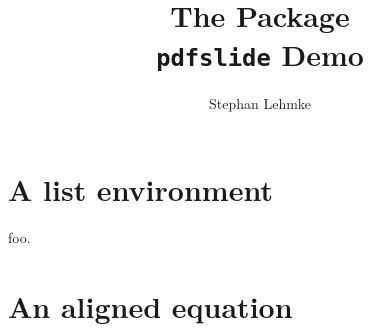 \documentclass{article}
\begin{document}
\title{The  Package\\{\normalfont \texttt{pdfslide} Demo}}
\author{Stephan Lehmke\\}
\maketitle

\tableofcontents

\section{A list environment}


\pause


\stepwise
{%
  \begin{description}
  \item[foo.] 
  \step{\item[baz.]} 
  \end{description}
  }



\section{An aligned equation}

\pause

\end{document}
